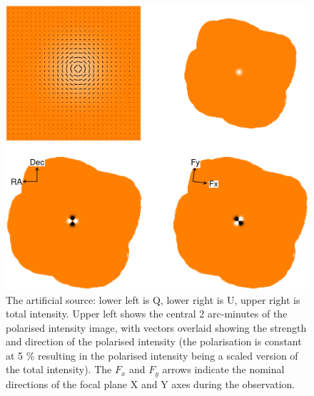 \documentclass[twoside,11pt]{starlink}
\begin{document}
\begin{figure}
\includegraphics[width=\columnwidth]{art}
\caption{The artificial source: lower left is Q, lower right is U, upper
right is total intensity. Upper left shows the central 2 arc-minutes of the
polarised intensity image, with vectors overlaid showing the strength and
direction of the polarised intensity (the polarisation is constant at 5
\% resulting in the polarised intensity being a scaled version of the
total intensity). The $F_{x}$ and $F_{y}$ arrows indicate the nominal
directions of the focal plane X and Y axes during the observation. }
\label{fig:art}
\end{figure}
\end{document}
